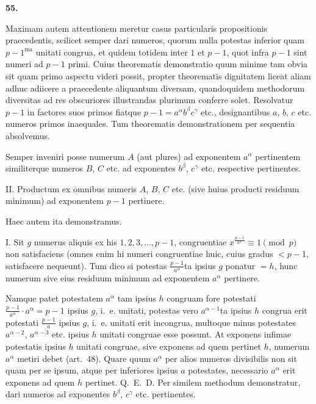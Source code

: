 \documentclass[12pt,a4paper]{article}
\theoremstyle{plain}
\theoremstyle{definition}
\theoremstyle{remark}
\begin{document}
\setcounter{satz}{55}
\addtocounter{satz}{-1}
\textbf{55.}

Maximam autem attentionem meretur casus particularis propositionis praecedentis, scilicet semper dari numeros, quorum nulla potestas inferior quam $p-1^{\text{ma}}$ unitati congrua, et quidem totidem inter $1$ et $p-1$, quot infra $p-1$ sint numeri ad $p-1$ primi. Cuius theorematis demonstratio quum minime tam obvia sit quam primo aspectu videri possit, propter theorematis dignitatem liceat aliam adhuc adiicere a praecedente aliquantum diversam, quandoquidem methodorum diversitas ad res obscuriores illustrandas plurimum conferre solet. Resolvatur $p-1$ in factores suos primos fiatque $p-1 = a^\alpha b^\beta c^\gamma$ etc., designantibus $a$, $b$, $c$ etc. numeros primos inaequales. Tum theorematis demonstrationem per sequentia absolvemus.

Semper inveniri posse numerum $A$ (aut plures) ad exponentem $a^\alpha$ pertinentem similiterque numeros $B$, $C$ etc. ad exponentes $b^\beta$, $c^\gamma$ etc. respective pertinentes.

II. Productum ex omnibus numeris $A$, $B$, $C$ etc. (sive huius producti residuum minimum) ad exponentem $p-1$ pertinere.

Haec autem ita demonstramus.

I. Sit $g$ numerus aliquis ex his $1, 2, 3, \ldots, p-1$, congruentiae $x^{\frac{p-1}{a^\alpha}} \equiv 1 \pmod{p}$ non satisfaciens (omnes enim hi numeri congruentiae huic, cuius gradus $<p-1$, satisfacere nequeunt). Tum dico si potestas $\frac{p-1}{a^\alpha}$ta ipsius $g$ ponatur $=h$, hunc numerum sive eius residuum minimum ad exponentem $a^\alpha$ pertinere.

Namque patet potestatem $a^\alpha$ tam ipsius $h$ congruam fore potestati $\frac{p-1}{a^\alpha} \cdot a^\alpha = p-1$ ipsius $g$, i.~e. unitati, potestas vero $a^{\alpha-1}$ta ipsius $h$ congrua erit potestati $\frac{p-1}{a}$ ipsius $g$, i.~e. unitati erit incongrua, multoque minus potestates $a^{\alpha-2}$, $a^{\alpha-3}$ etc. ipsius $h$ unitati congruae esse possunt. At exponens infimae potestatis ipsius $h$ unitati congruae, sive exponens ad quem pertinet $h$, numerum $a^\alpha$ metiri debet (art.~48). Quare quum $a^\alpha$ per alios numeros divisibilis non sit quam per se ipsum, atque per inferiores ipsius $a$ potestates, necessario $a^\alpha$ erit exponens ad quem $h$ pertinet. Q.~E.~D. Per similem methodum demonstratur, dari numeros ad exponentes $b^\beta$, $c^\gamma$ etc. pertinentes.
\end{document}
